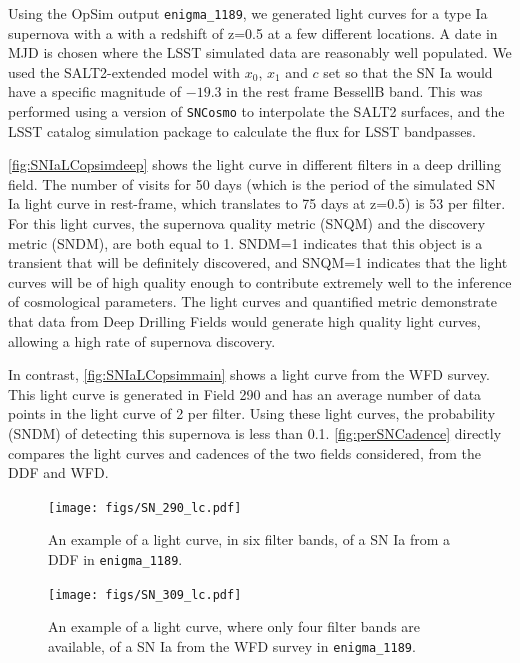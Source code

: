 Using the OpSim output \texttt{enigma\_1189}, we generated
light curves for a type Ia supernova with a with a redshift of z=0.5 at a few different
locations. A date in MJD is chosen where the LSST simulated data are
reasonably well populated. We used the SALT2-extended model
with $x_0$, $x_1$ and $c$ set so that the SN Ia would have a specific
magnitude of $-19.3$ in the rest frame BessellB band. This was performed
using a version of \texttt{SNCosmo} to interpolate the SALT2 surfaces, and the
LSST catalog simulation package to calculate the flux for LSST
bandpasses.


\autoref{fig:SNIaLCopsimdeep} shows the light curve in
different filters in a deep drilling field. The
number of visits for 50 days (which is the period of the simulated SN Ia light curve in
rest-frame, which translates to 75 days at z=0.5) is 53 per filter. For this light
curves, the supernova quality metric (SNQM) and the
discovery metric (SNDM), are both equal to 1. SNDM=1 indicates that this object is a transient that
will be definitely discovered, and SNQM=1 indicates that the light
curves will be of high quality enough to contribute extremely well to
the inference of cosmological parameters. The light curves and
quantified metric demonstrate that data from Deep Drilling Fields would
generate high quality light curves, allowing a high rate of supernova
discovery.

In contrast, \autoref{fig:SNIaLCopsimmain} shows a light curve from the WFD survey. This light
curve is
generated in Field 290 and has an average number
of data points in the light curve of 2 per filter. Using these light
curves, the probability (SNDM) of detecting this supernova is less
than 0.1. \autoref{fig:perSNCadence} directly compares the light curves and cadences of the two
fields considered, from the DDF and WFD.

\begin{figure}
\centering
\texttt{[image: figs/SN\_290\_lc.pdf]}
\caption{An example of a light curve, in six filter bands, of a SN Ia from a DDF in
\texttt{enigma\_1189}.
}
\label{fig:SNIaLCopsimdeep}
\end{figure}

\begin{figure}
\centering
\texttt{[image: figs/SN\_309\_lc.pdf]}
\caption{An example of a light curve, where only four filter bands are available, of a SN Ia from
the WFD survey in
\texttt{enigma\_1189}.
}
\label{fig:SNIaLCopsimmain}
\end{figure}

